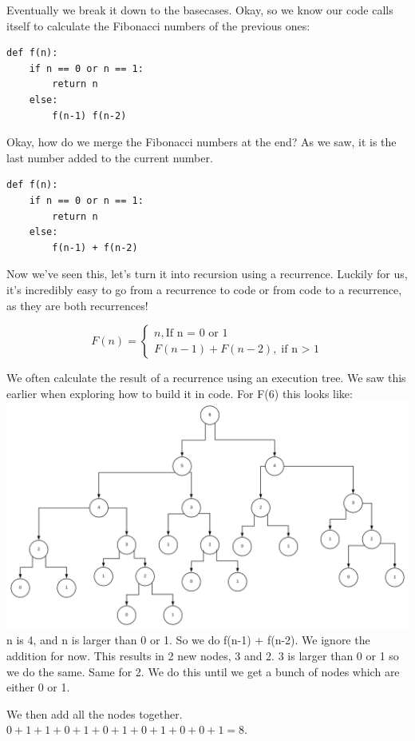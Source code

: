 \documentclass{article}
\begin{document}
Eventually we break it down to the basecases. Okay, so we know our code calls itself to calculate the Fibonacci numbers of the previous ones:

\begin{verbatim}
def f(n):
	if n == 0 or n == 1:
    	return n
	else:
    	f(n-1) f(n-2)
\end{verbatim}

Okay, how do we merge the Fibonacci numbers at the end? As we saw, it is the last number added to the current number.
\begin{verbatim}
def f(n):
	if n == 0 or n == 1:
    	return n
	else:
    	f(n-1) + f(n-2)
\end{verbatim}
Now we've seen this, let's turn it into recursion using a recurrence. Luckily for us, it's incredibly easy to go from a recurrence to code or from code to a recurrence, as they are both recurrences!

$$  F(n) = \begin{cases} n, \text{If n = 0 or 1} \\ F(n - 1) + F(n - 2), \; \text{if n > 1} \end{cases}$$

We often calculate the result of a recurrence using an execution tree. We saw this earlier when exploring how to build it in code. For F(6) this looks like:
\includegraphics[width=\textwidth,height=\textheight,keepaspectratio]{fib.png}
n is 4, and n is larger than 0 or 1. So we do f(n-1) + f(n-2). We ignore the addition for now. This results in 2 new nodes, 3 and 2. 3 is larger than 0 or 1 so we do the same. Same for 2. We do this until we get a bunch of nodes which are either 0 or 1. 

We then add all the nodes together. $0 + 1 + 1 + 0 + 1 + 0 + 1 + 0 + 1 + 0 + 0 + 1 = 8$.
\end{document}
